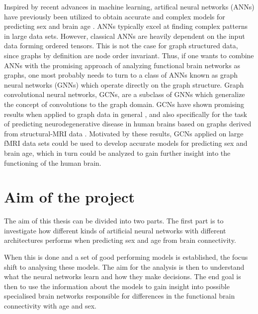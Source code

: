 Inspired by recent advances in machine learning, artifical neural networks (ANNs) have previously been utilized to obtain accurate and complex models for predicting sex and brain age \cite{amoroso_multiplex_age, stankeviciute, arslan}. ANNs typically excel at finding complex patterns in large data sets. However, classical ANNs are heavily dependent on the input data forming ordered tensors. This is not the case for graph structured data, since graphs by definition are node order invariant. Thus, if one wants to combine ANNs with the promising approach of analyzing functional brain networks as graphs, one most probably needs to turn to a class of ANNs known as graph neural networks (GNNs)  which operate directly on the graph structure. Graph convolutional neural networks, GCNs, are a subclass of GNNs which generalize the concept of convolutions to the graph domain. GCNs have shown promising results when applied to graph data in general \cite{kipf_semi_supervised, kipf_vae, wu_review}, and also specifically for the task of predicting neurodegenerative disease in human brains based on graphs derived from structural-MRI data \cite{jansson_sandstrom}. Motivated by these results, GCNs applied on large fMRI data sets could be used to develop accurate models for predicting sex and brain age, which in turn could be analyzed to gain further insight into the functioning of the human brain.



\section{Aim of the project}
The aim of this thesis can be divided into two parts. The first part is to investigate how different kinds of artificial neural networks with different architectures performs when predicting sex and age from brain connectivity.

When this is done and a set of good performing models is established, the focus shift to analysing these models. The aim for the analysis is then to understand what the neural networks learn and how they make decisions. The end goal is then to use the information about the models to gain insight into possible specialised brain networks responsible for differences in the functional brain connectivity with age and sex.

